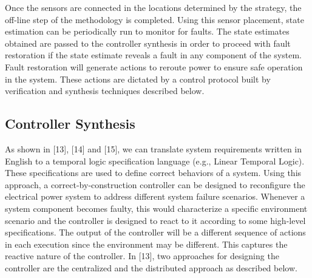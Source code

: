\documentclass[journal]{IEEEtran}
\begin{document}

Once the sensors are connected in the locations determined by the strategy, the off-line step of the methodology is completed. Using this sensor placement, state estimation can be periodically run to monitor for faults. The state estimates obtained are passed to the controller synthesis in order to proceed with fault restoration if the state estimate reveals a fault in any component of the system. Fault restoration will generate actions to reroute power to ensure safe operation in the system. These actions are dictated by a control protocol built by verification and synthesis techniques described below.
\subsection{Controller Synthesis}
As shown in [13], [14] and [15], we can translate system requirements written in English to a temporal logic specification language (e.g., Linear Temporal Logic). These specifications are used to define correct behaviors of a system. Using this approach, a correct-by-construction controller can be designed to reconfigure the electrical power system to address different system failure scenarios. Whenever a system component becomes faulty, this would characterize a specific environment scenario and the controller is designed to react to it according to some high-level specifications. The output of the controller will be a different sequence of actions in each execution since the environment may be different. This captures the reactive nature of the controller. In [13], two approaches for designing the controller are the centralized and the distributed approach as described below.
\end{document}
